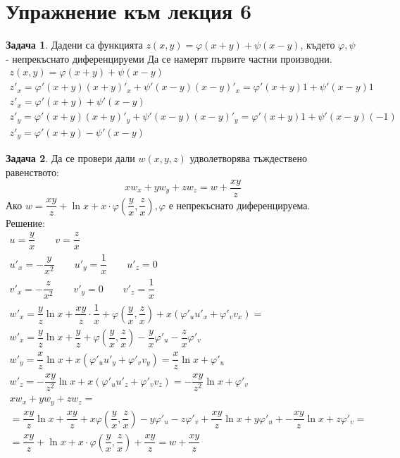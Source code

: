 \documentclass[a4paper,fleqn,12pt]{article}
\theoremstyle{definition}
\newtheorem{task}{Задача}[subsection]
\begin{document}
\newpage
\section{Упражнение към лекция 6}

\begin{task}
Дадени са функцията $z(x,y) = \varphi(x+y) + \psi(x-y)$, където $\varphi, \psi$ - непрекъснато диференцируеми
Да се намерят първите частни производни.
\begin{gather*}
z(x,y) = \varphi(x+y) + \psi(x-y) \\
z'_x = \varphi'(x+y)(x+y)'_x + \psi'(x-y)(x-y)'_x  = \varphi'(x+y)1 + \psi'(x-y)1\\
z'_x = \varphi'(x+y) + \psi'(x-y)\\
z'_y = \varphi'(x+y)(x+y)'_y + \psi'(x-y)(x-y)'_y = \varphi'(x+y)1 + \psi'(x-y)(-1) \\
z'_y = \varphi'(x+y) - \psi'(x-y)
\end{gather*}
\end{task}

\begin{task}
Да се провери дали $w(x,y,z)$ удволетворява тъждествено равенството:
$$x w_x + y w_y+z w_z = w + \dfrac{xy}{z}$$
Ако $w = \dfrac{xy}{z} + \ln{x} + x \cdot \varphi \left(\dfrac{y}{x}, \dfrac{z}{x}\right), \varphi$ е непрекъснато диференцируема.\\
Решение: \\ 
\begin{gather*}
u = \dfrac{y}{x} \qquad v = \dfrac{z}{x}\\
u'_x = - \dfrac{y}{x^2} \qquad u'_y = \dfrac{1}{x} \qquad u'_z = 0 \\
v'_x = - \dfrac{z}{x^2} \qquad v'_y = 0 \qquad v'_z = \dfrac{1}{x} \\
w'_x = \dfrac{y}{z} \ln{x} + \dfrac{xy}{z} \cdot \dfrac{1}{x} + \varphi \left(\dfrac{y}{x}, \dfrac{z}{x}\right) + x(\varphi'_u u'_x + \varphi'_v v_x) =\\
w'_x =\dfrac{y}{z} \ln{x} + \dfrac{y}{z}+ \varphi \left(\dfrac{y}{x}, \dfrac{z}{x}\right) -\dfrac{y}{x}\varphi'_u  - \dfrac{z}{x}\varphi'_v\\
w'_y = \dfrac{x}{z} \ln{x} + x(\varphi'_u u'_y + \varphi'_v v_y) = \dfrac{x}{z} \ln{x} + \varphi'_u \\
w'_z = -\dfrac{xy}{z^2} \ln{x} + x(\varphi'_u u'_z + \varphi'_v v_z) =  -\dfrac{xy}{z^2} \ln{x} + \varphi'_v\\
x w_x + y w_y+z w_z = \\
= \dfrac{xy}{z} \ln{x} + \dfrac{xy}{z}+ x \varphi \left(\dfrac{y}{x}, \dfrac{z}{x}\right) -y\varphi'_u  - z\varphi'_v + \dfrac{xy}{z} \ln{x} + y\varphi'_u + -\dfrac{xy}{z} \ln{x} + z\varphi'_v =\\
= \dfrac{xy}{z} + \ln{x} + x \cdot \varphi \left(\dfrac{y}{x}, \dfrac{z}{x}\right) +\dfrac{xy}{z} = w +\dfrac{xy}{z} 
\end{gather*}
\end{task}
\end{document}
